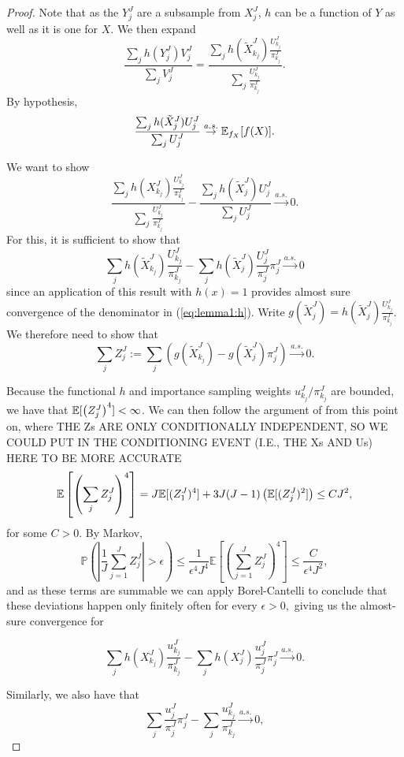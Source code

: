 \documentclass{article}
\begin{document}
\begin{proof}


    Note that as the $Y_j^J$ are a subsample from $X_j^J$, $h$ can be a function of $Y$ as well as it is one for $X$. We then expand
    $$\frac{\sum_j h(Y_j^J) V_j^J}{\sum_j V_j^J} = \frac{\sum_j h(\tilde X_{k_j}^J)\frac{U_{k_j}^J}{\pi_{k_j}^J}}{\sum_j \frac{U_{k_j}^J}{\pi_{k_j}^J}}.$$
    By hypothesis,
    $$\frac{\sum_j h(\tilde X_j^J)U_j^J}{\sum_j U_j^J} \stackrel{a.s.}{\to} \mathbb{E}_{f_X}[f(X)].$$

    We want to show
    \begin{equation}\label{eq:lemma1:h}
    \frac{\sum_j h(X_{k_j}^J)\frac{U_{k_j}^J}{\pi_{k_j}^J}}{\sum_j \frac{U_{k_j}^J}{\pi_{k_j}^J}} - \frac{\sum_j h(\tilde X_j^J)U_j^J}{\sum_j U_j^J} \stackrel{a.s.}{\to} 0.
    \end{equation}
    For this, it is sufficient to show that
   $$ \sum_j h(\tilde X_{k_j}^J)\frac{U_{k_j}^J}{\pi_{k_j}^J}
    -  \sum_j h(\tilde X_j^J)\frac{U_j^J}{\pi_j^J}\pi_j^J \stackrel{a.s.}{\to} 0 $$
    since an application of this result with $h(x)=1$ provides almost sure convergence of the denominator in (\ref{eq:lemma1:h}).
    Write $g(\tilde X_j^J) = h(\tilde X_j^J)\frac{U_{k_j}^J}{\pi_{k_j}^J}$. We therefore need to show that 
    $$\sum_j Z_j^J := \sum_j \left(g(\tilde X_{k_j}^J) -  g(\tilde X_j^J) \pi_j^J \right) \stackrel{a.s.}{\to} 0.$$

    Because the functional $h$ and importance sampling weights $u_{k_j}^J/\pi_{k_j}^J$ are bounded, we have that $\mathbb{E}[\left(Z_j^J\right)^4] < \infty$. We can then follow the argument of \cite{chopin20} from this point on, where 
    {THE Zs ARE ONLY CONDITIONALLY INDEPENDENT, SO WE COULD PUT IN THE CONDITIONING EVENT (I.E., THE Xs AND Us) HERE TO BE MORE ACCURATE}
    $$\mathbb{E}\left[\left(\sum_j Z_j^J\right)^4\right] 
    = J\mathbb{E}[(Z_1^J)^4] + 3J(J-1)\left(\mathbb{E}[(Z_j^J)^2]\right) \leq CJ^2,$$ for some $C>0$. By Markov, 
    $$\mathbb{P}\left(\left|\frac{1}{J} \sum_{j=1}^J Z_j^J\right|>\epsilon\right) 
    \leq \frac{1}{\epsilon^4J^4 } 
    \mathbb{E}\left[\left(\sum_{j=1}^J Z_j^J\right)^4\right] \leq \frac{C}{\epsilon^4J^2},$$
    and as these terms are summable we can apply Borel-Cantelli to conclude that these deviations happen only finitely often for every $\epsilon>0,$ giving us the almost-sure convergence for
    
    $$ \sum_j h(X_{k_j}^J)\frac{u_{k_j}^J}{\pi_{k_j}^J}
    -  \sum_j h(X_j^J)\frac{u_j^J}{\pi_j^J}\pi_j^J \stackrel{a.s.}{\to} 0.$$ 

    Similarly, we also have that
    $$ \sum_j \frac{u_j^J}{\pi_j^J}\pi_j^J
    - \sum_j \frac{u_{k_j}^J}{\pi_{k_j}^J} \stackrel{a.s.}{\to} 0,$$


\end{proof}
\end{document}
